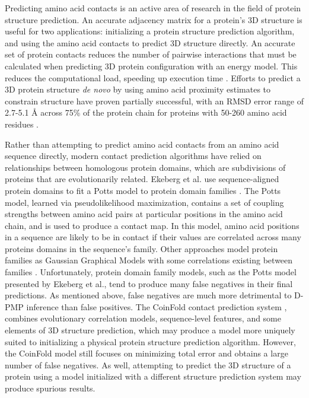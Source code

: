 \documentclass{article}
\begin{document}
Predicting amino acid contacts is an active area of research in the field of protein structure prediction. An accurate adjacency matrix for a protein's 3D structure is useful for two applications: initializing a protein structure prediction algorithm, and using the amino acid contacts to predict 3D structure directly. An accurate set of protein contacts reduces the number of pairwise interactions that must be calculated when predicting 3D protein configuration with an energy model. This reduces the computational load, speeding up execution time \cite{wuyun16}. 
Efforts to predict a 3D protein structure \emph{de novo} by using amino acid proximity estimates to constrain structure have proven partially successful, with an RMSD error range of 2.7-5.1 \AA{} across 75\% of the protein chain for proteins with 50-260 amino acid residues \cite{colwell11}.

Rather than attempting to predict amino acid contacts from an amino acid sequence directly, modern contact prediction algorithms have relied on relationships between homologous protein domains, which are subdivisions of proteins that are evolutionarily related. Ekeberg et al. use sequence-aligned protein domains to fit a Potts model to protein domain families \cite{ekeberg13}. The Potts model, learned via pseudolikelihood maximization, contains a set of coupling strengths between amino acid pairs at particular positions in the amino acid chain, and is used to produce a contact map. In this model, amino acid positions in a sequence are likely to be in contact if their values are correlated across many proteins domains in the sequence's family. Other approaches model protein families as Gaussian Graphical Models with some correlations existing between families \cite{ma15}. Unfortunately, protein domain family models, such as the Potts model presented by Ekeberg et al., tend to produce many false negatives in their final predictions. As mentioned above, false negatives are much more detrimental to D-PMP inference than false positives. The CoinFold contact prediction system \cite{wang16}, combines evolutionary correlation models,  sequence-level features, and some elements of 3D structure prediction, which may produce a model more uniquely suited to initializing a physical protein structure prediction algorithm. However, the CoinFold model still focuses on minimizing total error and obtains a large number of false negatives. As well, attempting to predict the 3D structure of a protein using a model initialized with a different structure prediction system may produce spurious results. 
\end{document}
